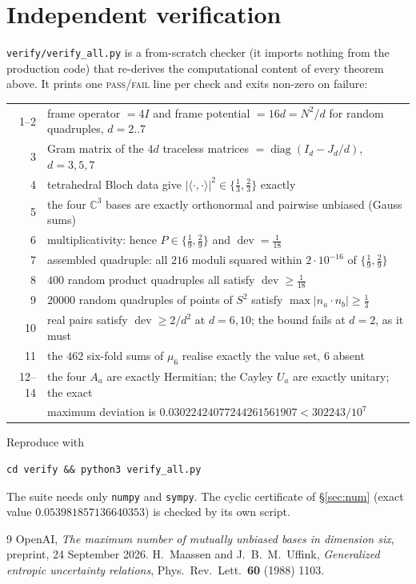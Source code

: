 \documentclass[11pt,a4paper]{article}
\theoremstyle{remark}
\newcommand{\C}{\mathbb{C}}
\newcommand{\dev}{\operatorname{dev}}
\begin{document}
\appendix
\section{Independent verification}
\label{app:verify}

\texttt{verify/verify\_all.py} is a from-scratch checker (it imports nothing from the
production code) that re-derives the computational content of every theorem above.  It prints
one \textsc{pass}/\textsc{fail} line per check and exits non-zero on failure:

\begin{center}
\small
\begin{tabular}{@{}rl@{}}
\toprule
1--2 & frame operator $=4I$ and frame potential $=16d=N^2/d$ for random quadruples, $d=2..7$\\
3 & Gram matrix of the $4d$ traceless matrices $=\operatorname{diag}(I_d-J_d/d)$, $d=3,5,7$\\
4 & tetrahedral Bloch data give $|\langle\cdot,\cdot\rangle|^2\in\{\tfrac13,\tfrac23\}$ exactly\\
5 & the four $\C^3$ bases are exactly orthonormal and pairwise unbiased (Gauss sums)\\
6 & multiplicativity: hence $P\in\{\tfrac19,\tfrac29\}$ and $\dev=\tfrac1{18}$\\
7 & assembled quadruple: all $216$ moduli squared within $2\cdot10^{-16}$ of $\{\tfrac19,\tfrac29\}$\\
8 & $400$ random product quadruples all satisfy $\dev\ge\tfrac1{18}$\\
9 & $20000$ random quadruples of points of $S^2$ satisfy $\max|n_a\cdot n_b|\ge\tfrac13$\\
10 & real pairs satisfy $\dev\ge2/d^2$ at $d=6,10$; the bound fails at $d=2$, as it must\\
11 & the $462$ six-fold sums of $\mu_6$ realise exactly the value set, $6$ absent\\
12--14 & the four $A_a$ are exactly Hermitian; the Cayley $U_a$ are exactly unitary; the exact\\
 & maximum deviation is $0.03022424077244261561907<302243/10^7$\\
\bottomrule
\end{tabular}
\end{center}

\noindent
Reproduce with
\begin{verbatim}
cd verify && python3 verify_all.py
\end{verbatim}
The suite needs only \texttt{numpy} and \texttt{sympy}.  The cyclic certificate of
\S\ref{sec:num} (exact value $0.053981857136640353$) is checked by its own script.

\begin{thebibliography}{9}
 OpenAI, \emph{The maximum number of mutually unbiased bases in dimension
six}, preprint, 24 September 2026.
 H.~Maassen and J.~B.~M.~Uffink, \emph{Generalized entropic uncertainty
relations}, Phys.\ Rev.\ Lett.\ \textbf{60} (1988) 1103.
\end{thebibliography}
\end{document}

